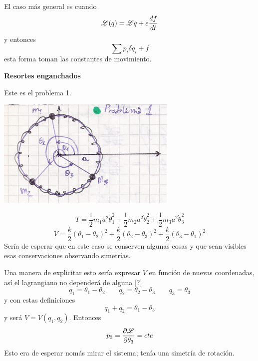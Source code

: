 \documentclass[10pt,oneside]{CBFT_book}
\begin{document}
El caso más general es cuando
\[
	\mathscr{L}(q) = \mathscr{L}{\dot{q}} + \varepsilon \frac{d^{\hspace{-0.05em}} {f}}{d {t}^{\hspace{-0.05em}}}
\]
y entonces
\[
	\sum p_i \delta q_i + f
\]
esta forma toman las constantes de movimiento.

\begin{ejemplo}{\bf Resortes enganchados}

Este es el problema 1.
 
\includegraphics[scale=0.3]{images/fig_mc_resortes.jpg} 

\[
	T = \frac 1 2 m_1 a^2 \dot{\theta}_1^2 + \frac 1 2 m_2 a^2 \dot{\theta}_2^2 + \frac 1 2 m_3 a^2 \dot{\theta}_3^2
\]
\[
	V = \frac k 2 (\theta_1 -\theta_2 )^2 + \frac k 2 (\theta_2 -\theta_3 )^2 + \frac k 2 (\theta_3 -\theta_1 )^2
\]
Sería de esperar que en este caso se conserven algunas cosas y que sean visibles esas conservaciones observando 
simetrías.

Una manera de explicitar esto sería expresar $V$ en función de nuevas coordenadas, así el lagrangiano no dependerá de 
alguna [?]
\[
	q_1 =\theta_1 -\theta_2 \qquad q_2 = \theta_2 -\theta_3 \qquad q_3 = \theta_3
\]
y con estas definiciones
\[
	q_1+q_2 = \theta_1-\theta_3 
\]
y será $V=V(q_1,q_2)$. Entonces 
\[
	p_3 = \frac{\partial^{\hspace{-0.05em}} {\mathscr{L}}}{\partial {\theta_3}^{\hspace{-0.05em}}} = cte
\]
Esto era de esperar nomás mirar el sistema; tenía una simetría de rotación.
\end{ejemplo}
\end{document}
